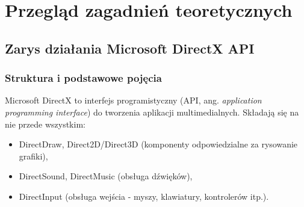 
\chapter{Przegląd zagadnień teoretycznych}

\section{Zarys działania Microsoft DirectX API}

\subsection{Struktura i podstawowe pojęcia}

Microsoft DirectX to interfejs programistyczny (API, ang. \emph{application programming interface}) do tworzenia aplikacji multimedialnych. Składają się na nie przede wszystkim:

\begin{itemize}
\item DirectDraw, Direct2D/Direct3D (komponenty odpowiedzialne za rysowanie grafiki),
\item DirectSound, DirectMusic (obsługa dźwięków),
\item DirectInput (obsługa wejścia - myszy, klawiatury, kontrolerów itp.).
\end{itemize}

